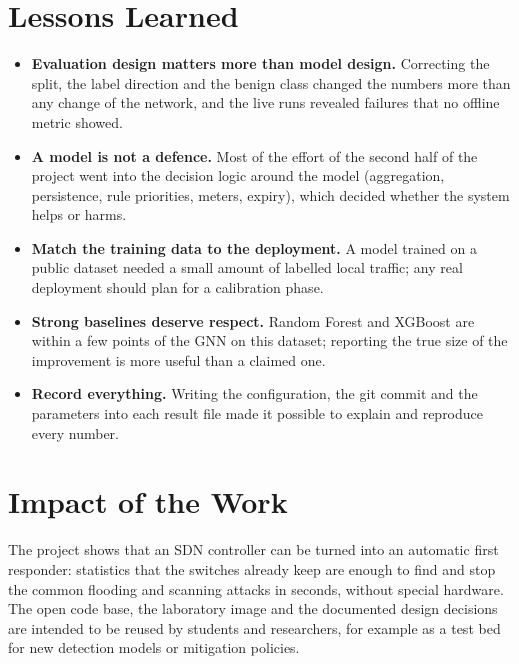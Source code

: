 \section{Lessons Learned}
\begin{itemize}
	\item \textbf{Evaluation design matters more than model design.} Correcting the split, the label direction and the benign class changed the numbers more than any change of the network, and the live runs revealed failures that no offline metric showed.
	\item \textbf{A model is not a defence.} Most of the effort of the second half of the project went into the decision logic around the model (aggregation, persistence, rule priorities, meters, expiry), which decided whether the system helps or harms.
	\item \textbf{Match the training data to the deployment.} A model trained on a public dataset needed a small amount of labelled local traffic; any real deployment should plan for a calibration phase.
	\item \textbf{Strong baselines deserve respect.} Random Forest and XGBoost are within a few points of the GNN on this dataset; reporting the true size of the improvement is more useful than a claimed one.
	\item \textbf{Record everything.} Writing the configuration, the git commit and the parameters into each result file made it possible to explain and reproduce every number.
\end{itemize}

\section{Impact of the Work}
The project shows that an SDN controller can be turned into an automatic first responder: statistics that the switches already keep are enough to find and stop the common flooding and scanning attacks in seconds, without special hardware. The open code base, the laboratory image and the documented design decisions are intended to be reused by students and researchers, for example as a test bed for new detection models or mitigation policies.


